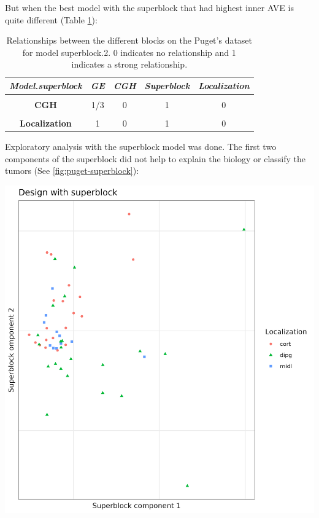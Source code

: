 \documentclass[
  12pt,
  a4paper,
  twoside,
  openright]{book}
\let\origfigure\figure
\let\endorigfigure\endfigure
\renewenvironment{figure}[1][2] {
    \expandafter\origfigure\expandafter[!htp]
} {
    \endorigfigure
}
\begin{document}
But when the best model with the superblock that had highest inner AVE is quite different (Table \ref{tab:puget-model-superblock-2}):

\begin{table}[H]

\caption[Model with superblock.2 for Puget's dataset.]{\label{tab:puget-model-superblock-2}Relationships between the different blocks on the Puget's dataset for model superblock.2. 0 indicates no relationship and 1 indicates a strong relationship.}
\centering
\begin{tabular}[t]{|>{}c|c|c|c|>{}c|}
\hline
\em{\textbf{Model.superblock}} & \em{\textbf{GE}} & \em{\textbf{CGH}} & \em{\textbf{Superblock}} & \em{\textbf{Localization}}\\
\hline
\textbf{\cellcolor{gray!6}{GE}} & \cellcolor{gray!6}{1} & \cellcolor{gray!6}{1/3} & \cellcolor{gray!6}{0} & \cellcolor{gray!6}{1}\\
\hline
\textbf{CGH} & 1/3 & 0 & 1 & 0\\
\hline
\textbf{\cellcolor{gray!6}{Superblock}} & \cellcolor{gray!6}{0} & \cellcolor{gray!6}{1} & \cellcolor{gray!6}{0} & \cellcolor{gray!6}{0}\\
\hline
\textbf{Localization} & 1 & 0 & 1 & 0\\
\hline
\end{tabular}
\end{table}

Exploratory analysis with the superblock model was done.
The first two components of the superblock did not help to explain the biology or classify the tumors (See \ref{fig:puget-superblock}):

\begin{figure}
\includegraphics[width=1\linewidth]{images/pugets_superblock} \caption[Superblock components on Puget's dataset]{First components of the superblock which has all the data of the samples on the Puget's dataset.}\label{fig:puget-superblock}
\end{figure}
\end{document}
